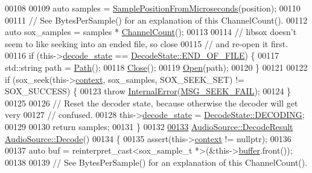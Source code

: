 \begin{DoxyCode}
00108 
00109     \textcolor{keyword}{auto} samples = \hyperlink{classAudioSource_ac0a5d14505c36238d4a8a465122ff06e}{SamplePositionFromMicroseconds}(position);
00110 
00111     \textcolor{comment}{// See BytesPerSample() for an explanation of this ChannelCount().}
00112     \textcolor{keyword}{auto} sox\_samples = samples * \hyperlink{classAudioSource_a267178b39a3a4d2fc86f41f6a96caf03}{ChannelCount}();
00113 
00114     \textcolor{comment}{// libsox doesn't seem to like seeking into an ended file, so close}
00115     \textcolor{comment}{// and re-open it first.}
00116     \textcolor{keywordflow}{if} (this->\hyperlink{classAudioSource_abe3899ebe685335a84c5bfee5a20a96f}{decode\_state} == \hyperlink{classAudioSource_a9a2f5de44325c84e69a7af1331aa159da581953f6b20ad7f993b64b1dc632032e}{DecodeState::END\_OF\_FILE}) \{
00117         std::string path = \hyperlink{classAudioSource_aea5c3828f1b22a9e103a5d56f9ffa5ec}{Path}();
00118         \hyperlink{classAudioSource_a46444de950d02ac35a695ad167fed2f4}{Close}();
00119         \hyperlink{classAudioSource_a9b10234d7c9f29b17008b4dc3eab2a71}{Open}(path);
00120     \}
00121 
00122     \textcolor{keywordflow}{if} (sox\_seek(this->\hyperlink{classAudioSource_a2bbce89d4bef9cf46b1113de3245655a}{context}, sox\_samples, SOX\_SEEK\_SET) != SOX\_SUCCESS) \{
00123         \textcolor{keywordflow}{throw} \hyperlink{classInternalError}{InternalError}(\hyperlink{messages_8h_aed3c894dfba47c4007dc39b38b5d3dbe}{MSG\_SEEK\_FAIL});
00124     \}
00125 
00126     \textcolor{comment}{// Reset the decoder state, because otherwise the decoder will get very}
00127     \textcolor{comment}{// confused.}
00128     this->\hyperlink{classAudioSource_abe3899ebe685335a84c5bfee5a20a96f}{decode\_state} = \hyperlink{classAudioSource_a9a2f5de44325c84e69a7af1331aa159da9b75f3acd3c3480965b0f5ee466e7f25}{DecodeState::DECODING};
00129 
00130     \textcolor{keywordflow}{return} samples;
00131 \}
00132 
\hypertarget{audio__source_8cpp_source_l00133}{}\hyperlink{classAudioSource_a6b5071168332523b68593bc47170f36f}{00133} \hyperlink{classAudioSource_aadbadeba50d982d09cfe0d1e05160ef9}{AudioSource::DecodeResult} \hyperlink{classAudioSource_a6b5071168332523b68593bc47170f36f}{AudioSource::Decode}()
00134 \{
00135     assert(this->\hyperlink{classAudioSource_a2bbce89d4bef9cf46b1113de3245655a}{context} != \textcolor{keyword}{nullptr});
00136 
00137     \textcolor{keyword}{auto} buf = \textcolor{keyword}{reinterpret\_cast<}sox\_sample\_t *\textcolor{keyword}{>}(&this->\hyperlink{classAudioSource_ad278f3b315e3ad91add683d5eda48a03}{buffer}.front());
00138 
00139     \textcolor{comment}{// See BytesPerSample() for an explanation of this ChannelCount().}

\end{DoxyCode}
